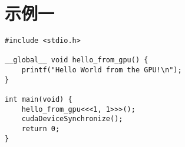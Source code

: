 \documentclass{ctexart}
\begin{document}
\section{示例一}
\begin{verbatim}
#include <stdio.h>

__global__ void hello_from_gpu() {
    printf("Hello World from the GPU!\n");
}

int main(void) {
    hello_from_gpu<<<1, 1>>>();
    cudaDeviceSynchronize();
    return 0;
}
\end{verbatim}
\end{document}
